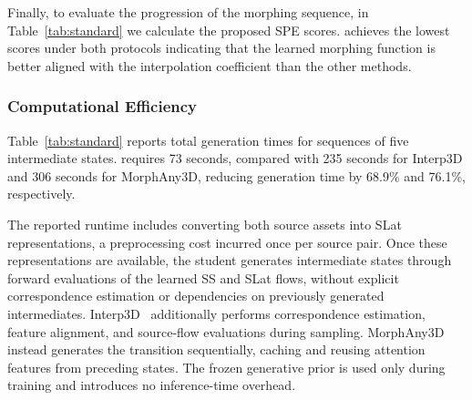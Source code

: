 Finally, to evaluate the progression of the morphing sequence, in Table~\ref{tab:standard} we calculate the proposed SPE scores. \methodname{} achieves the lowest scores under both protocols indicating that the learned morphing function is better aligned with the interpolation coefficient than the other methods. %



\subsubsection{Computational Efficiency}
Table~\ref{tab:standard} reports total generation times for sequences of five intermediate states. \methodname{} requires 73 seconds, compared with 235 seconds for Interp3D and 306 seconds for MorphAny3D, reducing generation time by 68.9\% and 76.1\%, respectively.

The reported runtime includes converting both source assets into SLat representations, a preprocessing cost incurred once per source pair. Once these representations are available, the student generates intermediate states through forward evaluations of the learned SS and SLat flows, without explicit correspondence estimation or dependencies on previously generated intermediates. Interp3D~\cite{liu2026interp3d} additionally performs correspondence estimation, feature alignment, and source-flow evaluations during sampling. MorphAny3D~\cite{sun2026morphany3d} instead generates the transition sequentially, caching and reusing attention features from preceding states. The frozen generative prior is used only during training and introduces no inference-time overhead.



